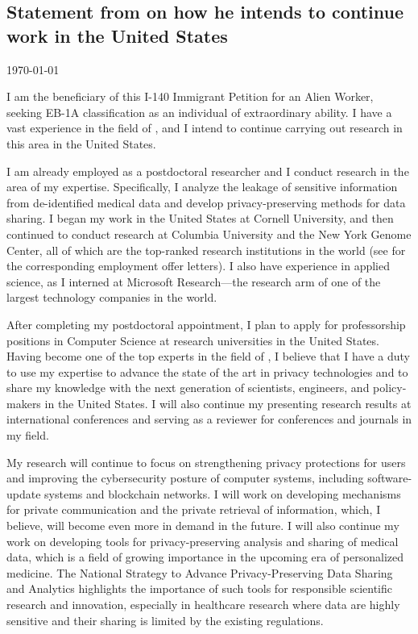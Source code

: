 \newpage
\subsection*{Statement from \dr on how he intends to continue work in the United States}
\label{plans}
\today
\bigskip

I am the beneficiary of this I-140 Immigrant Petition for an Alien Worker, seeking EB-1A classification as an individual of extraordinary
ability. I have a vast experience in the field of \dpcs, and I intend to
continue carrying out research in this area in the United States.

I am already employed as a postdoctoral researcher and I conduct research in
the area of my expertise. 
Specifically, I analyze the leakage of sensitive information from de-identified
medical data and develop privacy-preserving methods for data sharing.
I began my work in the United States at Cornell University, and then continued
to conduct research at Columbia University and the New York Genome Center, all
of which are the top-ranked research institutions in the world (see
 for the corresponding employment offer letters).
I also have experience in applied science, as I interned at Microsoft
Research---the research arm of one of the largest technology companies in the
world.

After completing my postdoctoral appointment, I plan to apply for professorship
positions in Computer Science at research universities in the United States.
Having become one of the top experts in the field of \dpcs, I believe that I
have a duty to use my expertise to advance the state of the art in privacy
technologies and to share my knowledge with the next generation of
scientists, engineers, and policy-makers in the United States.
I will also continue my presenting research results at international conferences
and serving as a reviewer for conferences and journals in my field.

My research will continue to focus on strengthening privacy protections for
users and improving the cybersecurity posture of computer systems, including
software-update systems and blockchain networks.
I will work on developing mechanisms for private communication and
the private retrieval of information, which, I believe, will become even more in
demand in the future.
I will also continue my work on developing tools for privacy-preserving
analysis and sharing of medical data, which is a field of growing importance in
the upcoming era of personalized medicine.
The National Strategy to Advance Privacy-Preserving Data Sharing and Analytics
highlights the importance of such tools for responsible scientific
research and innovation, especially in healthcare research where data are highly
sensitive and their sharing is limited by the existing regulations.

